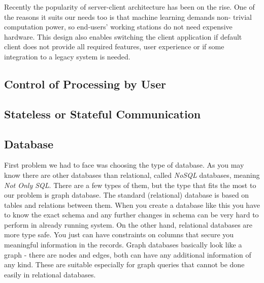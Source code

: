 


Recently the popularity of server-client architecture has been on the rise. One
of the reasons it suits our needs too is that machine learning demands non-
trivial computation power, so end-users' working stations do not need expensive
hardware. This design also enables switching the client application if default
\textan{} client does not provide all required features, user experience or if
some integration to a legacy system is needed.

\subsection{Control of Processing by User}
\label{ssec:ReportPipeline}


\subsection{Stateless or Stateful Communication}



\subsection{Database}


First problem we had to face was choosing the type of database. As you may know
there are other databases than relational, called \emph{NoSQL} databases,
meaning \emph{Not Only SQL}. There are a few types of them, but the type that
fits the most to our problem is graph database. The standard (relational)
database is based on tables and relations between them. When you create a
database like this you have to know the exact schema and any further changes in
schema can be very hard to perform in already running system. On the other hand,
relational databases are more type safe. You just can have constraints on
columns that secure you meaningful information in the records. Graph databases
basically look like a graph - there are nodes and edges, both can have any
additional information of any kind. These are suitable especially for graph
queries that cannot be done easily in relational databases.

